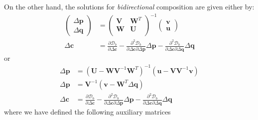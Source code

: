 On the other hand, the solutions for \emph{bidirectional} composition are given either by:
\begin{equation}
    \begin{aligned}
        \begin{pmatrix}
            \Delta\mathbf{p}
            \\
            \Delta\mathbf{q}
        \end{pmatrix} & = 
        \begin{pmatrix}
            \mathbf{V} & \mathbf{W}^T
            \\ 
            \mathbf{W} & \mathbf{U}
            \\
        \end{pmatrix}^{-1}
        \begin{pmatrix}
            \mathbf{v}
            \\
            \mathbf{u}
        \end{pmatrix}
        \\
        \Delta \mathbf{c} & = \frac{\partial \mathcal{D}_b}{\partial \Delta \mathbf{c}} - \frac{\partial^2 \mathcal{D}_b}{\partial \Delta \mathbf{c} \partial \Delta \mathbf{p}} \Delta \mathbf{p} - \frac{\partial^2 \mathcal{D}_b}{\partial \Delta \mathbf{c} \partial \Delta \mathbf{q}} \Delta \mathbf{q}
    \label{eq:bidirectional_newton_schur_solutions1}
    \end{aligned}
\end{equation}
or
\begin{equation}
    \begin{aligned}
        \Delta \mathbf{p} & = \left( \mathbf{U} - \mathbf{W} \mathbf{V}^{-1} \mathbf{W}^T \right)^{-1} \left(\mathbf{u} -  \mathbf{V} \mathbf{V}^{-1}\mathbf{v} \right)
    	\\
        \Delta \mathbf{p} & = \mathbf{V}^{-1} \left( \mathbf{v} - \mathbf{W}^T \Delta\mathbf{q}\right)
    	\\
        \Delta \mathbf{c} & = \frac{\partial \mathcal{D}_b}{\partial \Delta \mathbf{c}} - \frac{\partial^2 \mathcal{D}_b}{\partial \Delta \mathbf{c} \partial \Delta \mathbf{p}} \Delta \mathbf{p} - \frac{\partial^2 \mathcal{D}_b}{\partial \Delta \mathbf{c} \partial \Delta \mathbf{q}} \Delta \mathbf{q}
    \label{eq:bidirectional_newton_schur_solutions2}
    \end{aligned}
\end{equation}
where we have defined the following auxiliary matrices
